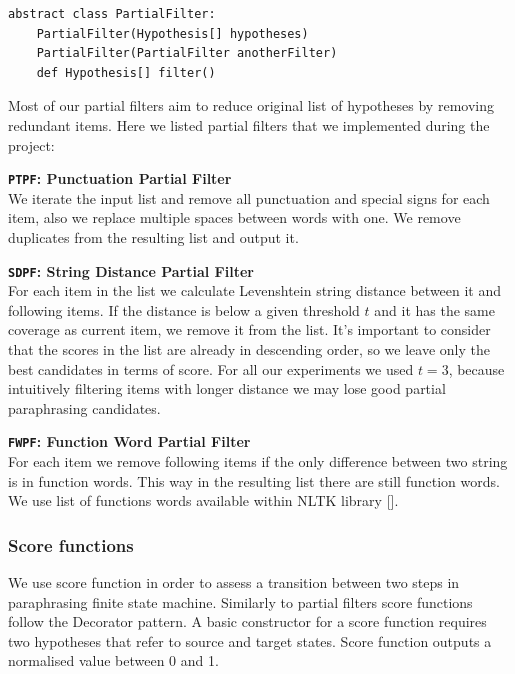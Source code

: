 \begin{verbatim}
abstract class PartialFilter:
    PartialFilter(Hypothesis[] hypotheses)
    PartialFilter(PartialFilter anotherFilter)
    def Hypothesis[] filter()
\end{verbatim}

Most of our partial filters aim to reduce original list of hypotheses by removing redundant items. Here we listed partial filters that we implemented during the project:

\begin{flushleft}

\textbf{\texttt{PTPF}: \textbf{Punctuation Partial Filter}} \\
We iterate the input list and remove all punctuation and special signs for each item, also we replace multiple spaces between words with one. We remove duplicates from the resulting list and output it.\\
\bigskip 

\textbf{\texttt{SDPF}: \textbf{String Distance Partial Filter}} \\
For each item in the list we calculate Levenshtein string distance between it and following items. If the distance is below a given threshold $t$ and it has the same coverage as current item, we remove it from the list. It's important to consider that the scores in the list are already in descending order, so we leave only the best candidates in terms of score. For all our experiments we used $t = 3$, because intuitively filtering items with longer distance we may lose good partial paraphrasing candidates. \\
\bigskip 

\textbf{\texttt{FWPF}: \textbf{Function Word Partial Filter}} \\
For each item we remove following items if the only difference between two string is in function words. This way in the resulting list there are still function words. We use list of functions words available within NLTK library []. \\
\bigskip 

\end{flushleft} 

\subsubsection{Score functions}

We use score function in order to assess a transition between two steps in paraphrasing finite state machine. Similarly to partial filters score functions follow the Decorator pattern. A basic constructor for a score function requires two hypotheses that refer to source and target states. Score function outputs a normalised value between 0 and 1. 

